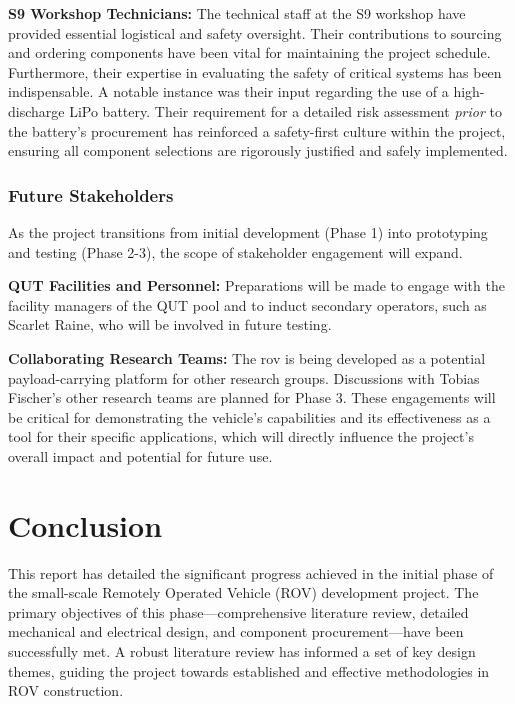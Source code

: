 \documentclass[11pt, a4paper]{article}
\begin{document}
\textbf{S9 Workshop Technicians:} The technical staff at the S9 workshop have provided essential logistical and safety oversight. Their contributions to sourcing and ordering components have been vital for maintaining the project schedule. Furthermore, their expertise in evaluating the safety of critical systems has been indispensable. A notable instance was their input regarding the use of a high-discharge LiPo battery. Their requirement for a detailed risk assessment \textit{prior} to the battery's procurement has reinforced a safety-first culture within the project, ensuring all component selections are rigorously justified and safely implemented.

\subsubsection{Future Stakeholders}
As the project transitions from initial development (Phase 1) into prototyping and testing (Phase 2-3), the scope of stakeholder engagement will expand.

\textbf{QUT Facilities and Personnel:} Preparations will be made to engage with the facility managers of the QUT pool and to induct secondary operators, such as Scarlet Raine, who will be involved in future testing.

\textbf{Collaborating Research Teams:} The \gls{rov} is being developed as a potential payload-carrying platform for other research groups. Discussions with Tobias Fischer's other research teams are planned for Phase 3. These engagements will be critical for demonstrating the vehicle's capabilities and its effectiveness as a tool for their specific applications, which will directly influence the project's overall impact and potential for future use.

\section{Conclusion}
\label{sec:conclusion}

This report has detailed the significant progress achieved in the initial phase of the small-scale Remotely Operated Vehicle (ROV) development project. The primary objectives of this phase—comprehensive literature review, detailed mechanical and electrical design, and component procurement—have been successfully met. A robust literature review has informed a set of key design themes, guiding the project towards established and effective methodologies in ROV construction.
\end{document}
